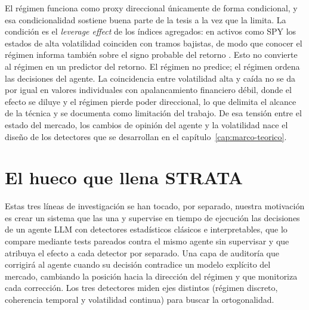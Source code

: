 El régimen funciona como proxy direccional únicamente de forma condicional, y esa condicionalidad sostiene buena parte de la tesis a la vez que la limita. La condición es el \emph{leverage effect} de los índices agregados: en activos como SPY los estados de alta volatilidad coinciden con tramos bajistas, de modo que conocer el régimen informa también sobre el signo probable del retorno \cite{black1976, christie1982}. Esto no convierte al régimen en un predictor del retorno. El régimen no predice; el régimen ordena las decisiones del agente. La coincidencia entre volatilidad alta y caída no se da por igual en valores individuales con apalancamiento financiero débil, donde el efecto se diluye y el régimen pierde poder direccional, lo que delimita el alcance de la técnica y se documenta como limitación del trabajo. De esa tensión entre el estado del mercado, los cambios de opinión del agente y la volatilidad nace el diseño de los detectores que se desarrollan en el capítulo~\ref{cap:marco-teorico}.

\section*{El hueco que llena STRATA}

Estas tres líneas de investigación se han tocado, por separado, nuestra motivación es crear un sistema que las una  y supervise en tiempo de ejecución las decisiones de un agente LLM con detectores estadísticos clásicos e interpretables, que lo compare mediante tests pareados contra el mismo agente sin supervisar y que atribuya el efecto a cada detector por separado. Una capa de auditoría que corrigirá al agente cuando su decisión contradice un modelo explícito del mercado, cambiando la posición hacia la dirección del régimen y que monitoriza cada corrección. Los tres detectores miden ejes distintos (régimen discreto, coherencia temporal y volatilidad continua) para buscar la ortogonalidad.
